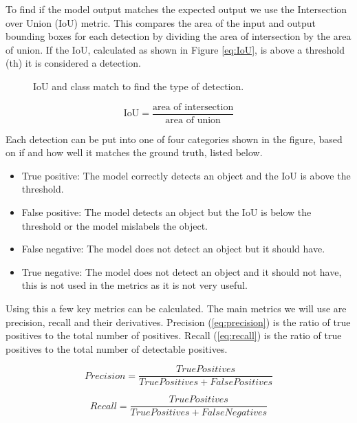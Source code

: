 To find if the model output matches the expected output we use the Intersection over Union (IoU) metric. This compares the area of the input and output bounding boxes for each detection by dividing the area of intersection by the area of union. If the IoU, calculated as shown in Figure \ref{eq:IoU}, is above a threshold (th) it is considered a detection.

\begin{figure}[h]
	\centering
	
	\caption{\label{fig:2_IoU_det} IoU and class match to find the type of detection.}
\end{figure}

\begin{equation}
	\text{IoU} = \frac{\text{area of intersection}}{\text{area of union}}
	\label{eq:IoU}
\end{equation}

Each detection can be put into one of four categories shown in the figure, based on if and how well it matches the ground truth, listed below.

\begin{itemize}
	\item True positive: The model correctly detects an object and the IoU is above the threshold.
	\item False positive: The model detects an object but the IoU is below the threshold or the model mislabels the object.
	\item False negative: The model does not detect an object but it should have.
	\item True negative: The model does not detect an object and it should not have, this is not used in the metrics as it is not very useful.
\end{itemize}

Using this a few key metrics can be calculated. The main metrics we will use are precision, recall and their derivatives. Precision (\ref{eq:precision}) is the ratio of true positives to the total number of positives. Recall (\ref{eq:recall}) is the ratio of true positives to the total number of detectable positives.



\begin{equation}
	Precision = \frac{TruePositives}{True Positives + False Positives}
	\label{eq:precision}
\end{equation}

\begin{equation}
	Recall = \frac{True Positives}{True Positives + False Negatives}
	\label{eq:recall}
\end{equation}

